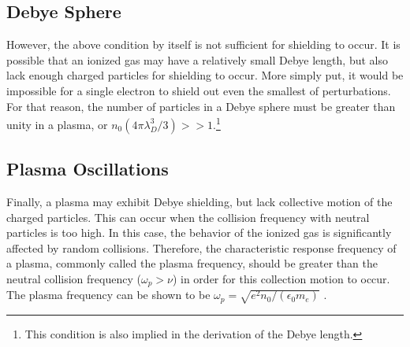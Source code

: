 \subsection{Debye Sphere}
However, the above condition by itself is not sufficient for shielding to occur.
It is possible that an ionized gas may have a relatively small Debye length, but
also lack enough charged particles for shielding to occur. More simply put, it
would be impossible for a single electron to shield out even the smallest of
perturbations. For that reason, the number of particles in a Debye sphere must
be greater than unity in a plasma, or $n_0(4\pi \lambda_D^3/3) >>
1$.\footnote{This condition is also implied in the derivation of the Debye
length.}

\subsection{Plasma Oscillations}
Finally, a plasma may exhibit Debye shielding, but lack collective motion of the
charged particles. This can occur when the collision frequency with neutral
particles is too high. In this case, the behavior of the ionized gas is
significantly affected by random collisions. Therefore, the characteristic
response frequency of a plasma, commonly called the plasma frequency, should be
greater than the neutral collision frequency ({$\omega_p > \nu$}) in order for
this collection motion to occur. The plasma frequency can be shown to be
$\omega_p = \sqrt{e^2n_0/(\epsilon_0 m_e)}$ \cite{Chen1984}.

